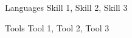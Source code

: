 

\begin{cvskills}

  \cvskill
    {Languages} %
    {Skill 1, Skill 2, Skill 3} %

  \cvskill
    {Tools} %
    {Tool 1, Tool 2, Tool 3} %

\end{cvskills}
